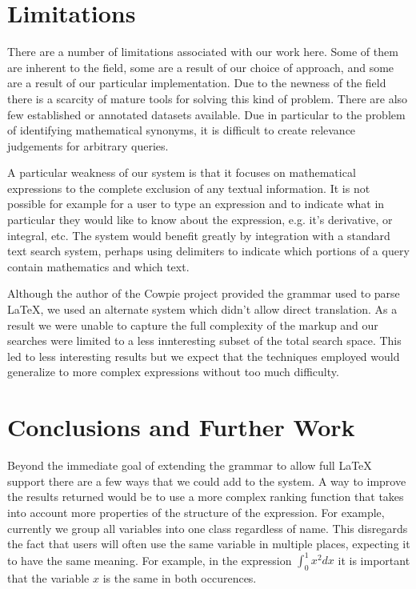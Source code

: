 \documentclass{sig-alternate}
\begin{document}
\section{Limitations}
There are a number of limitations associated with our work here. Some of them are inherent to the field,
some are a result of our choice of approach, and some are a result of our particular implementation. Due to the newness
of the field there is a scarcity of mature tools for solving this kind of problem. There are also few 
established or annotated datasets available. Due in particular to the problem of identifying mathematical
synonyms, it is difficult to create relevance judgements for arbitrary queries. 

A particular weakness of our system is that it focuses on mathematical expressions to the complete exclusion
of any textual information. It is not possible for example for a user to type an expression and to indicate what
in particular they would like to know about the expression, e.g. it's derivative, or integral, etc. The system would benefit greatly by integration with a standard text search system, perhaps using delimiters to indicate which portions
of a query contain mathematics and which text.

Although the author of the Cowpie project provided the grammar used to parse \LaTeX{}, we used an alternate system
which didn't allow direct translation. As a result we were unable to capture the full complexity of the markup and 
our searches were limited to a less innteresting subset of the total search space. This led to less interesting results
but we expect that the techniques employed would generalize to more complex expressions without too much difficulty.

\section{Conclusions and Further Work}
Beyond the immediate goal of extending the grammar to allow full \LaTeX{} support there are a few ways that we could 
add to the system. A way to improve the results returned would be to use a more complex ranking function that takes into
account more properties of the structure of the expression. For example, currently we group all variables into one
class regardless of name. This disregards the fact that users will often use the same variable in multiple places, 
expecting it to have the same meaning. For example, in the expression $\int_{0}^{1}x^{2} dx$ it is important that
the variable $x$ is the same in both occurences. 
\end{document}
